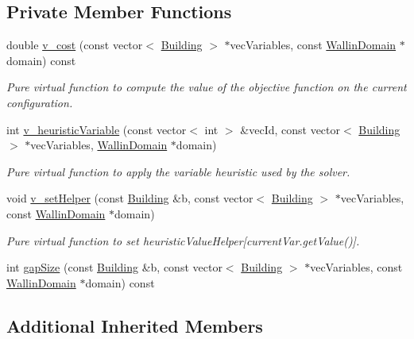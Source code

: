 \subsection*{Private Member Functions}
\begin{DoxyCompactItemize}
\item 
double \hyperlink{classghost_1_1GapObj_a0aff22c12b3a097df5a2314da5f41a04}{v\-\_\-cost} (const vector$<$ \hyperlink{classghost_1_1Building}{Building} $>$ $\ast$vec\-Variables, const \hyperlink{classghost_1_1WallinDomain}{Wallin\-Domain} $\ast$domain) const 
\begin{DoxyCompactList}\small\item\em Pure virtual function to compute the value of the objective function on the current configuration. \end{DoxyCompactList}\item 
int \hyperlink{classghost_1_1GapObj_a6cbd377f5f11676d918fcdf65f384cd3}{v\-\_\-heuristic\-Variable} (const vector$<$ int $>$ \&vec\-Id, const vector$<$ \hyperlink{classghost_1_1Building}{Building} $>$ $\ast$vec\-Variables, \hyperlink{classghost_1_1WallinDomain}{Wallin\-Domain} $\ast$domain)
\begin{DoxyCompactList}\small\item\em Pure virtual function to apply the variable heuristic used by the solver. \end{DoxyCompactList}\item 
void \hyperlink{classghost_1_1GapObj_afd55a0b02e6336d2a1f17e015488aa45}{v\-\_\-set\-Helper} (const \hyperlink{classghost_1_1Building}{Building} \&b, const vector$<$ \hyperlink{classghost_1_1Building}{Building} $>$ $\ast$vec\-Variables, const \hyperlink{classghost_1_1WallinDomain}{Wallin\-Domain} $\ast$domain)
\begin{DoxyCompactList}\small\item\em Pure virtual function to set heuristic\-Value\-Helper\mbox{[}current\-Var.\-get\-Value()\mbox{]}. \end{DoxyCompactList}\item 
int \hyperlink{classghost_1_1GapObj_abafdce010b63555042086d198f08f05d}{gap\-Size} (const \hyperlink{classghost_1_1Building}{Building} \&b, const vector$<$ \hyperlink{classghost_1_1Building}{Building} $>$ $\ast$vec\-Variables, const \hyperlink{classghost_1_1WallinDomain}{Wallin\-Domain} $\ast$domain) const 
\end{DoxyCompactItemize}
\subsection*{Additional Inherited Members}


